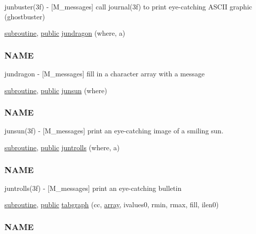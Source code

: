 \begin{DoxyCompactItemize}
\begin{DoxyCompactList}
junbuster(3f) -\/ \mbox{[}M\+\_\+messages\mbox{]} call journal(3f) to print eye-\/catching A\+S\+C\+II graphic (ghostbuster) \end{DoxyCompactList}\item 
\hyperlink{M__stopwatch_83_8txt_acfbcff50169d691ff02d4a123ed70482}{subroutine}, \hyperlink{M__stopwatch_83_8txt_a2f74811300c361e53b430611a7d1769f}{public} \hyperlink{namespacem__messages_a6bcbaab6d75a4389f2b77860ccc13a7c}{jundragon} (where, a)
\begin{DoxyCompactList}\small\item\em \subsubsection*{N\+A\+ME}

jundragon -\/ \mbox{[}M\+\_\+messages\mbox{]} fill in a character array with a message \end{DoxyCompactList}\item 
\hyperlink{M__stopwatch_83_8txt_acfbcff50169d691ff02d4a123ed70482}{subroutine}, \hyperlink{M__stopwatch_83_8txt_a2f74811300c361e53b430611a7d1769f}{public} \hyperlink{namespacem__messages_a93650d7a0b4288d714aa9eb575366137}{junsun} (where)
\begin{DoxyCompactList}\small\item\em \subsubsection*{N\+A\+ME}

junsun(3f) -\/ \mbox{[}M\+\_\+messages\mbox{]} print an eye-\/catching image of a smiling sun. \end{DoxyCompactList}\item 
\hyperlink{M__stopwatch_83_8txt_acfbcff50169d691ff02d4a123ed70482}{subroutine}, \hyperlink{M__stopwatch_83_8txt_a2f74811300c361e53b430611a7d1769f}{public} \hyperlink{namespacem__messages_ab7a9bba52e514a4183070ae0fc6ccebd}{juntrolls} (where, a)
\begin{DoxyCompactList}\small\item\em \subsubsection*{N\+A\+ME}

juntrolls(3f) -\/ \mbox{[}M\+\_\+messages\mbox{]} print an eye-\/catching bulletin \end{DoxyCompactList}\item 
\hyperlink{M__stopwatch_83_8txt_acfbcff50169d691ff02d4a123ed70482}{subroutine}, \hyperlink{M__stopwatch_83_8txt_a2f74811300c361e53b430611a7d1769f}{public} \hyperlink{namespacem__messages_acc516fb8a4dd9eede3abb535ff7496e0}{tabgraph} (cc, \hyperlink{intro__blas1_83_8txt_a89db1945e1a335ab0184c6a097821e32}{array}, ivalues0, rmin, rmax, fill, ilen0)
\begin{DoxyCompactList}\small\item\em \subsubsection*{N\+A\+ME}


\end{DoxyCompactList}
\end{DoxyCompactItemize}
